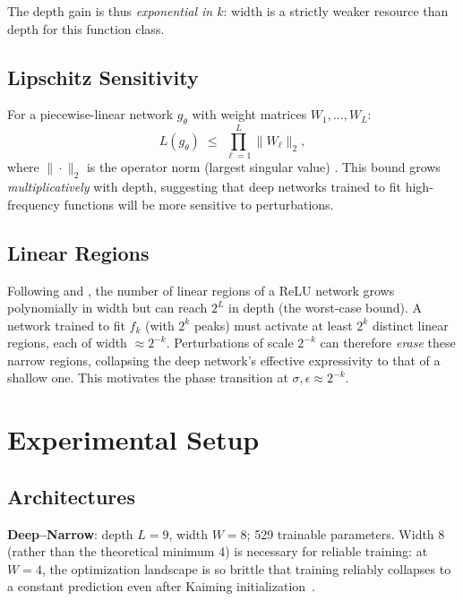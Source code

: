 \documentclass[10pt,twocolumn]{article}
\begin{document}
The depth gain is thus \emph{exponential in $k$}: width is a strictly weaker resource
than depth for this function class.

\subsection{Lipschitz Sensitivity}

For a piecewise-linear network $g_\theta$ with weight matrices $W_1, \ldots, W_L$:
\begin{equation}
  L(g_\theta) \;\leq\; \prod_{\ell=1}^{L} \|W_\ell\|_2,
\end{equation}
where $\|\cdot\|_2$ is the operator norm (largest singular value)
\citep{bartlett2017spectrally, sokolic2017robust}.
This bound grows \emph{multiplicatively} with depth, suggesting that deep networks
trained to fit high-frequency functions will be more sensitive to perturbations.

\subsection{Linear Regions}

Following \citet{montufar2014number} and \citet{hanin2019deep}, the number of linear
regions of a ReLU network grows polynomially in width but can reach $2^{L}$ in depth
(the worst-case bound). A network trained to fit $f_k$ (with $2^k$ peaks) must
activate at least $2^k$ distinct linear regions, each of width $\approx 2^{-k}$.
Perturbations of scale $2^{-k}$ can therefore \emph{erase} these narrow regions,
collapsing the deep network's effective expressivity to that of a shallow one.
This motivates the phase transition at $\sigma, \epsilon \approx 2^{-k}$.

\section{Experimental Setup}
\label{sec:setup}

\subsection{Architectures}

\textbf{Deep–Narrow}: depth $L=9$, width $W=8$; 529 trainable parameters.
Width 8 (rather than the theoretical minimum 4) is necessary for reliable training:
at $W=4$, the optimization landscape is so brittle that training reliably collapses
to a constant prediction even after Kaiming initialization~\citep{he2015delving}.
\end{document}
